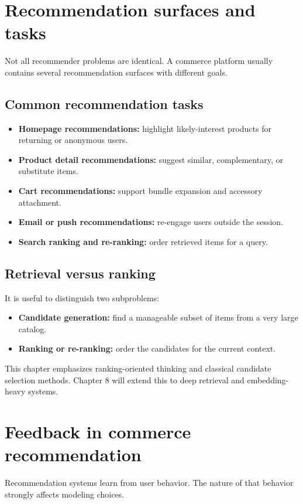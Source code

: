 \section{Recommendation surfaces and tasks}
Not all recommender problems are identical.
A commerce platform usually contains several recommendation surfaces with different goals.

\subsection{Common recommendation tasks}
\begin{itemize}
  \item \textbf{Homepage recommendations:} highlight likely-interest products for returning or anonymous users.
  \item \textbf{Product detail recommendations:} suggest similar, complementary, or substitute items.
  \item \textbf{Cart recommendations:} support bundle expansion and accessory attachment.
  \item \textbf{Email or push recommendations:} re-engage users outside the session.
  \item \textbf{Search ranking and re-ranking:} order retrieved items for a query.
\end{itemize}

\subsection{Retrieval versus ranking}
It is useful to distinguish two subproblems:
\begin{itemize}
  \item \textbf{Candidate generation:} find a manageable subset of items from a very large catalog.
  \item \textbf{Ranking or re-ranking:} order the candidates for the current context.
\end{itemize}

This chapter emphasizes ranking-oriented thinking and classical candidate selection methods.
Chapter 8 will extend this to deep retrieval and embedding-heavy systems.

\section{Feedback in commerce recommendation}
Recommendation systems learn from user behavior.
The nature of that behavior strongly affects modeling choices.

